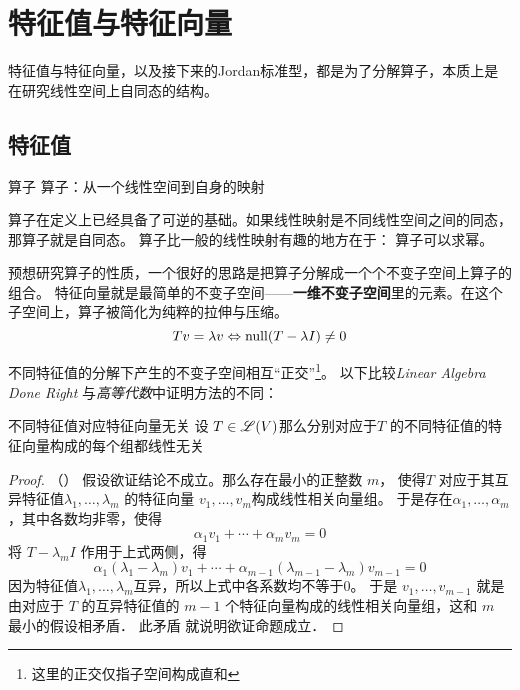 \chapter{特征值与特征向量}
特征值与特征向量，以及接下来的Jordan标准型，都是为了分解算子，本质上是在研究线性空间上自同态的结构。

\section{特征值}
\begin{definition}{算子}
    算子：从一个线性空间到自身的映射
\end{definition}

算子在定义上已经具备了可逆的基础。如果线性映射是不同线性空间之间的同态，那算子就是自同态。
算子比一般的线性映射有趣的地方在于： 算子可以求幂。

预想研究算子的性质，一个很好的思路是把算子分解成一个个不变子空间上算子的组合。
特征向量就是最简单的不变子空间——\textbf{一维不变子空间}里的元素。在这个子空间上，算子被简化为纯粹的拉伸与压缩。
\[
    Tv=\lambda v \Leftrightarrow \operatorname{null}(T-\lambda I)\neq {0}
\]

不同特征值的分解下产生的不变子空间相互``正交''\footnote{这里的正交仅指子空间构成直和}。
以下比较\textit{Linear Algebra Done Right} 与\textit{高等代数}中证明方法的不同：

\begin{theorem}{不同特征值对应特征向量无关}
    设 \(T \in \mathscr{L}(V)\)那么分别对应于\(T\) 的不同特征值的特征向量构成的每个组都线性无关
\end{theorem}

\begin{proof}
    （\cite[p.~114]{LADR}）
    假设欲证结论不成立。那么存在最小的正整数 \(m\)， 使得\(T\)
    对应于其互异特征值\(\lambda_1, \dots ,\lambda_{m}\)
    的特征向量 \(v_1, \dots, v_m\)构成线性相关向量组。
    于是存在\(\alpha_1, \dots ,\alpha_{m}\)，其中各数均非零，使得
    \[\alpha_1 v_1 + \cdots + \alpha_m v_m = 0\]
    将 \(T-\lambda_{m}I\) 作用于上式两侧，得
    \[
        \alpha_1 (\lambda_1 - \lambda_m)v_1 + \cdots +
        \alpha_{m-1} (\lambda_{m-1} - \lambda_m)v_{m-1} = 0
    \]
    因为特征值\(\lambda_1,\dots ,\lambda_{m}\)互异，所以上式中各系数均不等于0。
    于是 \(v_1, \dots , v_{m-1}\) 就是由对应于 \(T\)
    的互异特征值的 \(m- 1\) 个特征向量构成的线性相关向量组，这和 \(m\) 最小的假设相矛盾． 此矛盾
    就说明欲证命题成立．
\end{proof}

